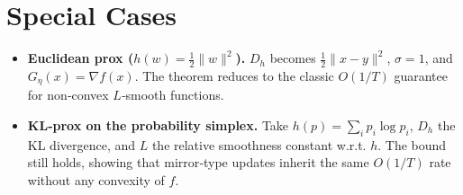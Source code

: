 \documentclass{article}
\begin{document}
\section*{Special Cases}
\begin{itemize}
\item \textbf{Euclidean prox ($h(w)=\tfrac12\|w\|^{2}$).}  
$D_{h}$ becomes $\tfrac12\|x-y\|^{2}$, $\sigma=1$, and $G_{\eta}(x)=\nabla f(x)$. The theorem reduces to the classic $O(1/T)$ guarantee for non‑convex $L$‑smooth functions.
\item \textbf{KL‑prox on the probability simplex.}  
Take $h(p)=\sum_{i}p_{i}\log p_{i}$, $D_{h}$ the KL divergence, and $L$ the relative smoothness constant w.r.t. $h$. The bound still holds, showing that mirror‑type updates inherit the same $O(1/T)$ rate without any convexity of $f$.
\end{itemize}
\end{document}
